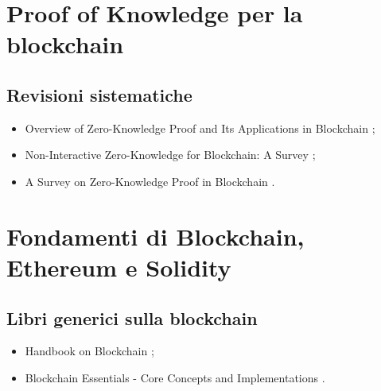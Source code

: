 \section*{Proof of Knowledge per la blockchain}

\subsection*{Revisioni sistematiche}
\begin{itemize}

\item Overview of Zero-Knowledge Proof and Its Applications in Blockchain \cite{zhou2022zerochain};

\item Non-Interactive Zero-Knowledge for Blockchain: A Survey \cite{partala2020zerochain};

\item A Survey on Zero-Knowledge Proof in Blockchain \cite{sun2021zerochain}.

\end{itemize}

\section*{Fondamenti di Blockchain, Ethereum e Solidity}

\subsection*{Libri generici sulla blockchain}
\begin{itemize}

\item Handbook on Blockchain \cite{tran2022blockchain};

\item Blockchain Essentials - Core Concepts and Implementations \cite{mangrulkar2024blockchain}.

\end{itemize}

